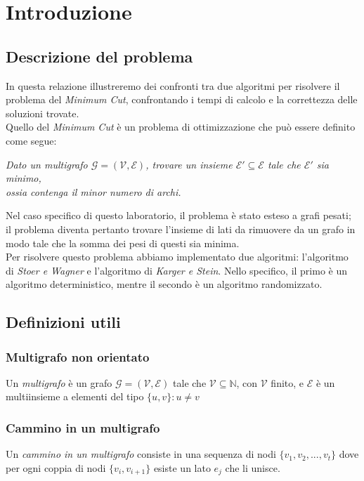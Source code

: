 \section{Introduzione}

\subsection{Descrizione del problema}
In questa relazione illustreremo dei confronti tra due algoritmi per risolvere il problema del \textit{Minimum Cut}, confrontando i tempi di calcolo e la correttezza delle soluzioni trovate. \\
Quello del \textit{Minimum Cut} è un problema di ottimizzazione che può essere definito come segue:
\begin{center}
    \centering
    \textit{
        Dato un multigrafo $\mathcal{G}=(\mathcal{V}, \mathcal{E})$, trovare un insieme $\mathcal{E}{}'\subseteq \mathcal{E}$ tale che $\mathcal{E}{}'$ sia minimo,\\ ossia contenga il minor numero di archi.
    }
\end{center}
Nel caso specifico di questo laboratorio, il problema è stato esteso a grafi pesati; il problema diventa pertanto trovare l'insieme di lati da rimuovere da un grafo in modo tale che la somma dei pesi di questi sia minima. \\
Per risolvere questo problema abbiamo implementato due algoritmi: l'algoritmo di \textit{Stoer e Wagner} e l'algoritmo di \textit{Karger e Stein}. Nello specifico, il primo è un algoritmo deterministico, mentre il secondo è un algoritmo randomizzato.

\subsection{Definizioni utili}

\subsubsection*{Multigrafo non orientato}
Un \textit{multigrafo} è un grafo $\mathcal{G}=(\mathcal{V}, \mathcal{E})$ tale che $\mathcal{V} \subseteq \mathbb{N}$, con $\mathcal{V}$ finito, e $\mathcal{E}$ è un multiinsieme a elementi del tipo $\{u, v\}: u\neq v$

\subsubsection*{Cammino in un multigrafo}
Un \textit{cammino in un multigrafo} consiste in una sequenza di nodi $\{v_1, v_2, ..., v_t\}$ dove per ogni coppia di nodi $\{v_i, v_{i+1}\}$ esiste un lato $e_j$ che li unisce.

